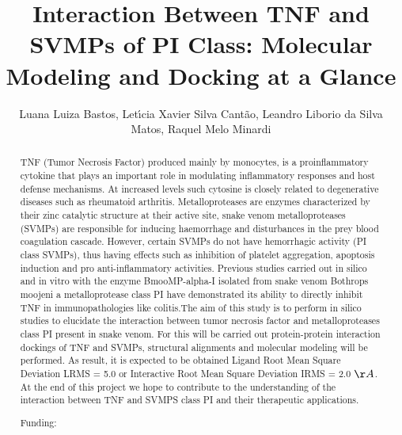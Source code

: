 \documentclass[twoside]{article}
\title{\vspace{-15mm}\fontsize{24pt}{10pt}\selectfont\textbf{ Interaction Between TNF and SVMPs of PI Class: Molecular Modeling and Docking at a Glance }} %
\author{ Luana Luiza Bastos, Let\'{\i}cia Xavier Silva Cant\~ao, Leandro Liborio da Silva Matos, Raquel Melo Minardi }
\affil{ Universidade Federal de Minas Gerais - UFMG }
\date{}
\begin{document}
  
  
  \maketitle %
  
  
  \thispagestyle{fancy} %
  
  
  \begin{abstract}
  TNF (Tumor Necrosis Factor) produced mainly by monocytes,  is a proinflammatory cytokine that plays an important role in modulating inflammatory responses and host defense mechanisms. At increased levels such cytosine is closely related to degenerative diseases such as rheumatoid arthritis. Metalloproteases are enzymes characterized by their zinc catalytic structure at their active site,   snake venom metalloproteases (SVMPs) are responsible for inducing haemorrhage and disturbances in the prey blood coagulation cascade. However,  certain SVMPs do not have hemorrhagic activity (PI class SVMPs),  thus having effects such as inhibition of platelet aggregation,  apoptosis induction and pro anti-inflammatory activities. Previous studies carried out in silico and in vitro with the enzyme BmooMP-alpha-I isolated from snake venom Bothrops moojeni  a  metalloprotease class PI have demonstrated its ability to directly inhibit TNF in immunopathologies like colitis.The aim of this study is to perform in silico studies to elucidate the interaction between tumor necrosis factor and metalloproteases class PI present  in snake venom. For this will  be carried out protein-protein interaction dockings of TNF and SVMPs,  structural alignments and molecular modeling will be performed. As result,  it is expected to be obtained Ligand Root Mean Square Deviation LRMS = 5.0 or Interactive Root Mean Square Deviation IRMS = 2.0 $\AA$.  At the end of this project we hope to contribute to the understanding of the interaction between TNF and SVMPS class PI and their therapeutic applications.
  
  Funding:  \\ 
  \end{abstract}
  
\end{document}
